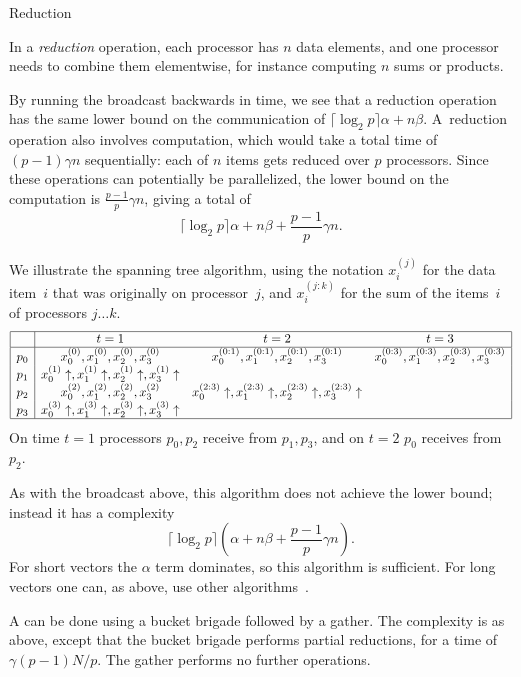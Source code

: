 
 {Reduction}
\label{sec:reduction}

In a \emph{reduction} operation, each processor has $n$ data elements, and
one processor needs to combine them elementwise, for instance
computing $n$ sums or products.

By running the broadcast backwards in time, we see that a reduction
operation has the same lower bound on the communication of
$\lceil\log_2 p\rceil \alpha+n\beta$.  A~reduction operation also
involves computation, which would take a total time of $(p-1)\gamma n$
sequentially: each of
$n$ items gets reduced over $p$ processors. Since these operations can
potentially be parallelized, the lower bound on the computation is
$\frac{p-1}p \gamma n$, giving a total of
    \[ \lceil\log_2 p\rceil \alpha+n\beta +\frac{p-1}p \gamma n. \]

We illustrate the spanning tree algorithm,
using the notation $x_i^{(j)}$ for the data item~$i$
that was originally on processor~$j$, and $x_i^{(j:k)}$ for the sum of
the items~$i$ of processors $j\ldots k$.
\[
\begin{array}{|c|ccc|}
\hline
  &t=1&t=2&t=3\\ \hline
p_0&x_0^{(0)},x_1^{(0)},x_2^{(0)},x_3^{(0)}
   &x_0^{(0:1)},x_1^{(0:1)},x_2^{(0:1)},x_3^{(0:1)}
   &x_0^{(0:3)},x_1^{(0:3)},x_2^{(0:3)},x_3^{(0:3)}\\
p_1&x_0^{(1)}\uparrow,x_1^{(1)}\uparrow,x_2^{(1)}\uparrow,x_3^{(1)}\uparrow
   &&\\
p_2&x_0^{(2)},x_1^{(2)},x_2^{(2)},x_3^{(2)}
   &x_0^{(2:3)}\uparrow,x_1^{(2:3)}\uparrow,x_2^{(2:3)}\uparrow,x_3^{(2:3)}\uparrow
   &\\
p_3&x_0^{(3)}\uparrow,x_1^{(3)}\uparrow,x_2^{(3)}\uparrow,x_3^{(3)}\uparrow
   &&\\
\hline
\end{array}
\]
On time $t=1$ processors $p_0,p_2$ receive from $p_1,p_3$, and on
$t=2$ $p_0$ receives from~$p_2$.

As with the broadcast above, 
this algorithm does not achieve the lower bound; instead it has a complexity
\[ \lceil\log_2 p\rceil (\alpha+n\beta +\frac{p-1}p \gamma n). \]
For short vectors the $\alpha$ term dominates, so this algorithm is sufficient.
For long vectors one can, as above, use other algorithms~\cite{Chan2007Collective}.

A  can be done using a bucket
brigade followed by a gather. The complexity is as above, except that
the bucket brigade performs partial reductions, for a time
of~$\gamma(p-1)N/p$. The gather performs no further operations.

